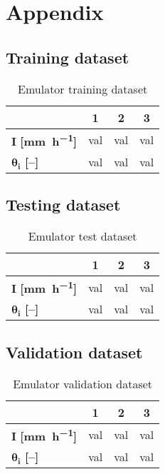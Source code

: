 
\chapter{Appendix}
\label{Appendix}

\section{Training dataset}
\label{sec:training_dataset}

\begin{table}[htpb]
  \centering
  \caption{Emulator training dataset}
  \label{tab:training_dataset}
  \begin{tabular}{lccc}
    \toprule
     & \textbf{1} & \textbf{2} & \textbf{3}\\
    \midrule
    $\bm{I}$ \textbf{[\si{\milli\meter\per\hour}]} & val & val & val \\
    $\bm{\theta_i}$ \textbf{[--]} & val & val & val \\
    \bottomrule
  \end{tabular}
\end{table}

\section{Testing dataset}
\label{sec:testing_dataset}

\begin{table}[htpb]
  \centering
  \caption{Emulator test dataset}
  \label{tab:test_dataset}
  \begin{tabular}{lccc}
    \toprule
     & \textbf{1} & \textbf{2} & \textbf{3}\\
    \midrule
    $\bm{I}$ \textbf{[\si{\milli\meter\per\hour}]} & val & val & val \\
    $\bm{\theta_i}$ \textbf{[--]} & val & val & val \\
    \bottomrule
  \end{tabular}
\end{table}

\section{Validation dataset}
\label{sec:validation_dataset}

\begin{table}[htpb]
  \centering
  \caption{Emulator validation dataset}
  \label{tab:validation_dataset}
  \begin{tabular}{lccc}
    \toprule
     & \textbf{1} & \textbf{2} & \textbf{3}\\
    \midrule
    $\bm{I}$ \textbf{[\si{\milli\meter\per\hour}]} & val & val & val \\
    $\bm{\theta_i}$ \textbf{[--]} & val & val & val \\
    \bottomrule
  \end{tabular}
\end{table}


